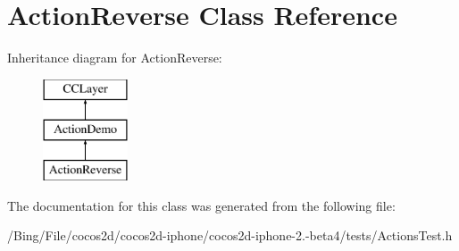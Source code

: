 \hypertarget{interface_action_reverse}{\section{Action\-Reverse Class Reference}
\label{interface_action_reverse}
}
Inheritance diagram for Action\-Reverse\-:\begin{figure}[H]
\begin{center}
\leavevmode
\includegraphics[height=3.000000cm]{interface_action_reverse}
\end{center}
\end{figure}


The documentation for this class was generated from the following file\-:\begin{DoxyCompactItemize}
\item 
/\-Bing/\-File/cocos2d/cocos2d-\/iphone/cocos2d-\/iphone-\/2.-\/beta4/tests/Actions\-Test.\-h\end{DoxyCompactItemize}
